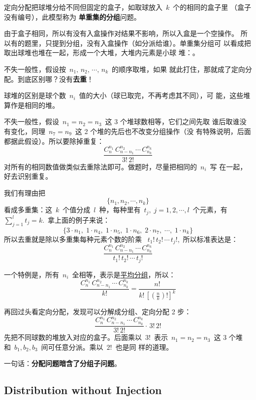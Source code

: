 定向分配把球堆分给不同但固定的盒子，如取球放入~$k$~个的相同的盒子里
（盒子没有编号），此模型称为 \textbf{单重集的分组}问题。

由于盒子相同，所以有没有入盒操作对结果不影响，所以入盒是一个空操作。
所以有的题里，只提到分组，没有入盒操作（如分派给谁）。单重集分组可
以看成把取出球堆也堆在一起，形成一个大堆，大堆内元素是小球
堆：。

不失一般性，假设按~$n_1,\, n_2,\, \cdots,\, n_k$~的顺序取堆，如果
就此打住，那就成了定向分配。到底区别哪？没有\textbf{去重}！

球堆的区别是球个数~$n_i$~值的大小（球已取完，不再考虑其不同），可
能，这些堆算作是相同的堆。

不失一般性，假设~$n_1 = n_2 = n_3$~这 3 个堆球数相等，它们之间先取
谁后取谁没有变化，同理~$n_7 = n_9$~这 2 个堆的先后也不改变分组操作（没
有特殊说明，后面都据此假设）。所以要除掉重复：
\[ \frac{C_n^{n_1}\, C_{n - n_1}^{n_2}\, \cdots\, C_{n_k}^{n_k} }{
    3! \, 2! } \]
对所有的相同数值做类似去重除法即可。做题时，尽量把相同的~$n_i$~写
在一起，好去识别重复。

我们有理由把
\[ \{ n_1, n_2, \cdots, n_k \} \]
看成多重集：这~$k$~个值分成~$l$~种，每种里有~$t_j,\; j = 1, 2,
\cdots, l$~个元素，有~$\sum_{j = 1}^lt_j = k$.~拿上面的例子来说：
\[ \{ 3 \cdot n_1,\; 1 \cdot n_4,\; 1 \cdot n_5,\; 1 \cdot n_6,\;
  2 \cdot n_7,\; \cdots,\; 1 \cdot n_k \} \]
所以去重就是除以多重集每种元素个数的阶乘
~$t_1! \, t_2! \, \cdots \, t_j!$,~所以标准表达是：
\[ \frac{C_n^{n_1}\, C_{n - n_1}^{n_2}\, \cdots\, C_{n_k}^{n_k}
  }{t_1! \, t_2! \, \cdots \, t_j! } \]

一个特例是，所有~$n_i$~全相等，表示是\uline{平均分组}，所以：
\[ \frac{C_n^{n_1}\, C_{n - n_1}^{n_2}\, \cdots\, C_{n_k}^{n_k} }{
    k! } = \frac{ n! }{ k! \, [ (\frac{ n }{ k })! ]^k } \]

再回过头看定向分配，发现可以分解成分组、定向分配 2 步：
\[ \frac{C_n^{n_1}\, C_{n - n_1}^{n_2}\, \cdots\, C_{n_k}^{n_k} }{
    3! \, 2! } \cdot\, 3! \, 2! \]
先把不同球数的堆放入对应的盒子。后面乘以~$3!$~表示~$n_1 = n_2 =
n_3$~这 3 个堆和~$b_1, b_2, b_3$~间可任意分派。乘以~$2!$~也是同
样的道理。

一句话：\textbf{分配问题暗含了分组子问题}。

\subsection{Distribution without Injection}
\label{sec:distr-with-inject}

